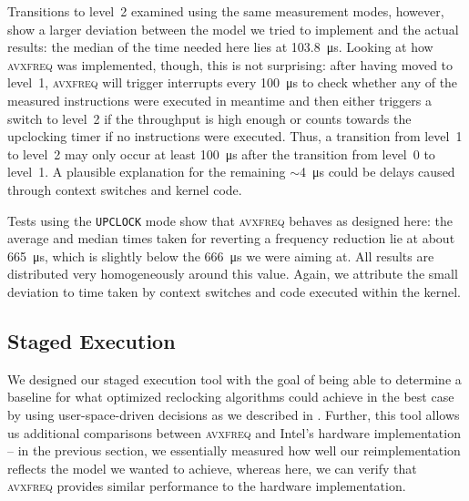 Transitions to level~2 examined using the same measurement modes, however, show a larger deviation between the model we tried to implement and the actual results: the median of the time needed here lies at \SI{103.8}{\micro\second}. Looking at how \textsc{avxfreq} was implemented, though, this is not surprising: after having moved to level~1, \textsc{avxfreq} will trigger interrupts every \SI{100}{\micro\second} to check whether any of the measured instructions were executed in meantime and then either triggers a switch to level~2 if the throughput is high enough or counts towards the upclocking timer if no instructions were executed. Thus, a transition from level~1 to level~2 may only occur at least \SI{100}{\micro\second} after the transition from level~0 to level~1. A plausible explanation for the remaining $\sim$\SI{4}{\micro\second} could be delays caused through context switches and kernel code. %

Tests using the \texttt{UPCLOCK} mode show that \textsc{avxfreq} behaves as designed here: the average and median times taken for reverting a frequency reduction lie at about \SI{665}{\micro\second}, which is slightly below the \SI{666}{\micro\second} we were aiming at. All results are distributed very homogeneously around this value. Again, we attribute the small deviation to time taken by context switches and code executed within the kernel.

\subsection{Staged Execution}
\label{sec:evaluation:results:stagedexecution}

We designed our staged execution tool with the goal of being able to determine a baseline for what optimized reclocking algorithms could achieve in the best case by using user-space-driven decisions as we described in . Further, this tool allows us additional comparisons between \textsc{avxfreq} and Intel's hardware implementation -- in the previous section, we essentially measured how well our reimplementation reflects the model we wanted to achieve, whereas here, we can verify that \textsc{avxfreq} provides similar performance to the hardware implementation.

